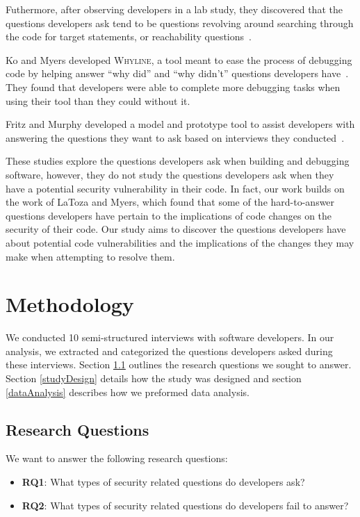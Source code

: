 \documentclass[conference]{IEEEtran}
\begin{document}
Futhermore, after observing developers in a lab study, they discovered that the questions developers ask tend to be questions revolving around searching through the code for target statements, or reachability questions~\cite{latoza2010developers}. 

Ko and Myers developed \textsc{Whyline}, a tool meant to ease the process of debugging code by helping answer ``why did'' and ``why didn't'' questions developers have~\cite{ko2004designing}. They found that developers were able to complete more debugging tasks when using their tool than they could without it.

Fritz and Murphy developed a model and prototype tool to assist developers with answering the questions they want to ask based on interviews they conducted~\cite{fritz2010using}.


These studies explore the questions developers ask when building and debugging software, however, they do not study the questions developers ask when they have a potential security vulnerability in their code. 
In fact, our work builds on the work of LaToza and Myers, which found that some of the hard-to-answer questions developers have pertain to the implications of code changes on the security of their code. 
Our study aims to discover the questions developers have about potential code vulnerabilities and the implications of the changes they may make when attempting to resolve them. 

\section{Methodology}
\label{sec:meth}
We conducted 10 semi-structured interviews with software developers. In our analysis, we extracted and categorized the questions developers asked during these interviews. Section \ref{rqs} outlines the research questions we sought to answer. Section \ref{studyDesign} details how the study was designed and section \ref{dataAnalysis} describes how we preformed data analysis.


\subsection{Research Questions}
\label{rqs}
We want to answer the following research questions:
\begin{itemize}
\item \textbf{RQ1}: What types of security related questions do developers ask?
\item \textbf{RQ2}: What types of security related questions do developers fail to answer?
\end{itemize}
\end{document}
